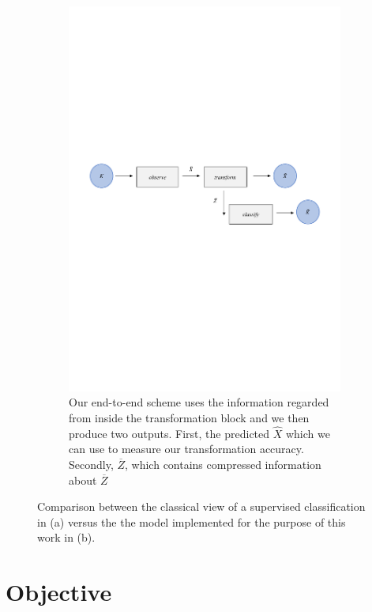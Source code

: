 \begin{figure}[H]
	\begin{subfigure}{1\textwidth} 
		\centering
		\includegraphics[width=16.5cm]{Figuras_tfg/Figura1_1_tfg}
		\caption{Our end-to-end scheme uses the information regarded from inside the transformation block and we then produce two outputs. First, the predicted $\hat{X}$ which we can use to measure our transformation accuracy. Secondly, $\overline{Z}$, which contains compressed information about $\overline{Z}$}
		\label{fig:fig1a} 
	\end{subfigure}%
	\caption{Comparison between the classical view of a supervised classification in (a) versus the the model implemented for the purpose of this work in (b).}
	\label{fig:fig1}
\end{figure}

\section{Objective}

